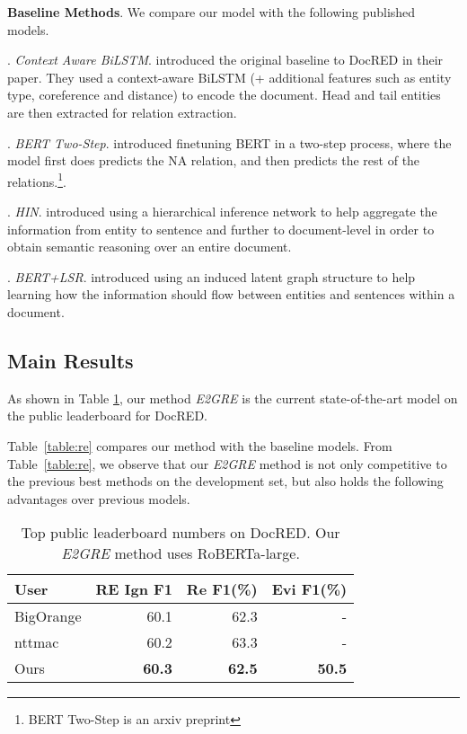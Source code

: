 \documentclass[11pt,a4paper]{article}
\begin{document}
\noindent\textbf{Baseline Methods}. We compare our model with the following published models.

. \textit{Context Aware BiLSTM}. \citet{docred} introduced the original baseline to DocRED in their paper. They used a context-aware BiLSTM (+ additional features such as entity type, coreference and distance) to encode the document. Head and tail entities are then extracted for relation extraction.

. \textit{BERT Two-Step}. \citet{twostepBert} introduced finetuning BERT in a two-step process, where the model first does predicts the NA relation, and then predicts the rest of the relations.\footnote{BERT Two-Step is an arxiv preprint}.

. \textit{HIN}. \citet{tang2020hin} introduced using a hierarchical inference network to help aggregate the information from entity to sentence and further to document-level in order to obtain semantic reasoning over an entire document.

. \textit{BERT+LSR}. \citet{acl2020latentreasoning} introduced using an induced latent graph structure to help learning how the information should flow between entities and sentences within a document.


\subsection{Main Results}
As shown in Table \ref{table:leaderboard}, our method {\em E2GRE} is the current state-of-the-art model on the public leaderboard for DocRED. 

Table~\ref{table:re} compares our method with the baseline models. From Table~\ref{table:re}, we observe that our {\em E2GRE} method is not only competitive to the previous best methods on the development set, but also holds the following advantages over previous models.


\begin{table}[!h]
\begin{small}
\begin{center}
\begin{tabular}{|l|r|r|r|}
\hline \bf User & \bf RE Ign F1 & \bf Re F1(\%) & \bf Evi F1(\%)\\ \hline
BigOrange & 60.1 & 62.3 & - \\
nttmac  & 60.2 & 63.3 & - \\
Ours  & \bf 60.3 & \bf 62.5 & \bf 50.5\\ 
\hline
\end{tabular}
\end{center}
\end{small}
\caption{\label{font-table} Top public leaderboard numbers on DocRED. Our {\em E2GRE} method uses RoBERTa-large.
}
\label{table:leaderboard}
\end{table}
\end{document}
